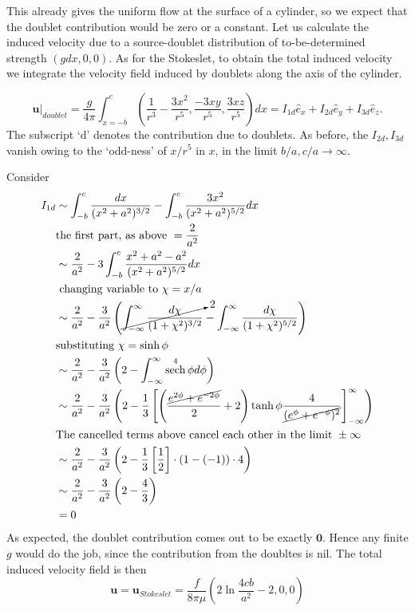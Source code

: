 \documentclass{article}
\DeclareMathOperator{\sech}{sech}
\begin{document}
This already gives the uniform flow at the surface of a cylinder, so we expect that the doublet contribution would be zero or a constant. Let us calculate the induced velocity due to a source-doublet distribution of to-be-determined strength $(gdx, 0, 0)$. As for the Stokeslet, to obtain the total induced velocity we  integrate the velocity field induced by doublets along the axis of the cylinder. 

\begin{equation}
 \boldsymbol{u}\bigg|_{doublet} = \frac{g}{4\pi}\int_{x=-b}^{c}\left( \frac{1}{r^{3}} - \frac{3x^{2}}{r^{5}}, \frac{-3xy}{r^{5}}, \frac{3xz}{r^{5}}\right)dx=  I_{1d}\hat{e}_{x} + I_{2d}\hat{e}_{y} + I_{3d}\hat{e}_{z}.
\end{equation}
The subscript `d' denotes the contribution due to doublets. As before, the $I_{2d}, I_{3d}$ vanish owing to the `odd-ness' of $x/r^{5}$ in $x$, in the limit $b/a, c/a \rightarrow \infty$. 

Consider 
\begin{align}
 \begin{split}
  I_{1d} &\sim \int_{-b}^{c}\frac{dx}{(x^{2}+a^{2})^{3/2}} - \int_{-b}^{c}\frac{3x^{2}}{(x^{2}+a^{2})^{5/2}} dx\\
  &\textrm{the first part, as above }=\frac{2}{a^{2}}\\
  &\sim \frac{2}{a^{2}} - 3\int_{-b}^{c}\frac{x^{2} + a^{2} - a^{2}}{(x^{2}+a^{2})^{5/2}} dx \\
  &\textrm{ changing variable to } \chi = x/a\\
  &\sim \frac{2}{a^{2}} - \frac{3}{a^{2}}\left(\cancelto{2}{\int_{-\infty}^{\infty} \frac{d\chi}{(1+\chi^{2})^{3/2}} } - \int_{-\infty}^{\infty} \frac{d\chi}{(1+\chi^{2})^{5/2}} \right)\\
  &\textrm{substituting }\chi = \sinh{\phi}\\
  &\sim \frac{2}{a^{2}} - \frac{3}{a^{2}}\left(2 - \int_{-\infty}^{\infty} \sech^{4}{\phi}d\phi\right)\\
  &\sim \frac{2}{a^{2}} - \frac{3}{a^{2}}\left(2 - \frac{1}{3}\left[\left(\frac{\cancel{e^{2\phi} + e^{-2\phi}}}{2} + 2\right) \tanh{\phi} \frac{4}{\cancel{(e^{\phi}+e^{-\phi})^{2}}}\right]_{-\infty}^{\infty}\right)\\
  &\textrm{The cancelled terms above cancel each other in the limit }\pm \infty\\
  &\sim \frac{2}{a^{2}} - \frac{3}{a^{2}}\left(2 - \frac{1}{3}\left[ \frac{1}{2}\right]\cdot(1-(-1))\cdot 4\right)\\
  &\sim \frac{2}{a^{2}} - \frac{3}{a^{2}}\left(2 - \frac{4}{3}\right)\\
  &=0
 \end{split}
\end{align}
As expected, the doublet contribution comes out to be exactly $\boldsymbol{0}$. Hence any finite $g$ would do the job, since the contribution from the doubltes is nil. The total induced velocity field is then 
\begin{equation}\label{eq:u}
 \boldsymbol{u} = \boldsymbol{u}_{Stokeslet} = \frac{f}{8\pi \mu} \left(2 \ln{\frac{4cb}{a^{2}}} - 2, 0, 0\right)
\end{equation}
\end{document}
